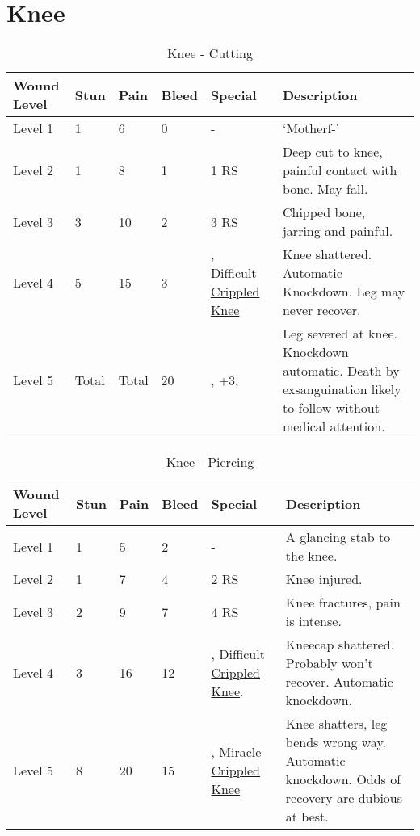 \documentclass[oneside,11pt,english]{book}
\begin{document}
\section{Knee} \vspace{-25pt} \label{sec:knee}
\begin{table}[hb] %
	\caption{Knee - Cutting}
	\label{wound:Knee - Cutting}
	\begin{tabu} to 
Wound Level &Stun &Pain &Bleed &Special &Description\\\toprule
Level 1& 1& 6& 0& - &‘Motherf-’\\
Level 2& 1& 8& 1&  1 RS &Deep cut to knee, painful contact with bone. May fall.\\
Level 3& 3& 10& 2&  3 RS &Chipped bone, jarring and painful.\\
Level 4& 5& 15& 3& , \newline
Difficult~ \hyperref[bane:Crippled Limb/Appendage]{Crippled Knee} &Knee shattered. Automatic Knockdown. Leg may never recover.\\
Level 5& Total& Total& 20 &
	, \newline
		 +3, \newline
	&Leg severed at knee. Knockdown automatic. Death by exsanguination likely to follow without medical attention.\\
	\end{tabu}
\end{table}

\begin{table}[hb] %
	\caption{Knee - Piercing}
	\label{wound:Knee - Piercing}
	\begin{tabu} to 
Wound Level &Stun &Pain &Bleed &Special &Description\\\toprule
Level 1& 1& 5& 2& - &A glancing stab to the knee.\\
Level 2& 1& 7& 4&  2 RS &Knee injured.\\
Level 3& 2& 9& 7&  4 RS &Knee fractures, pain is intense.\\
Level 4& 3& 16& 12& , \newline
Difficult~ \hyperref[bane:Crippled Limb/Appendage]{Crippled Knee}. &Kneecap shattered. Probably won't recover. Automatic knockdown.\\
Level 5& 8& 20& 15& , \newline
Miracle~ \hyperref[bane:Crippled Limb/Appendage]{Crippled Knee} &Knee shatters, leg bends wrong way. Automatic knockdown. Odds of recovery are dubious at best.\\
	\end{tabu}
\end{table}
\end{document}
